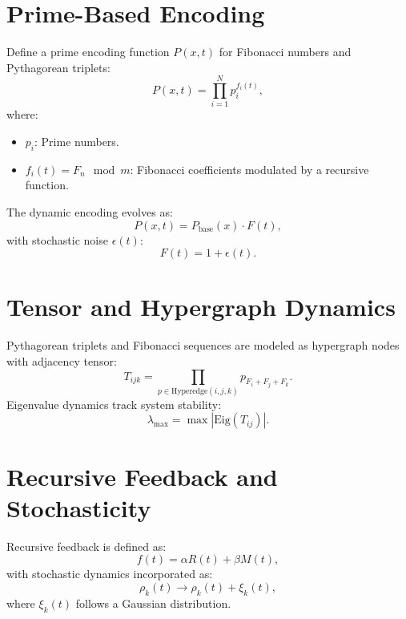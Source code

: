 \documentclass{article}
\theoremstyle{plain}
\begin{document}
\section{Prime-Based Encoding}
Define a prime encoding function $P(x, t)$ for Fibonacci numbers and Pythagorean triplets:
\begin{equation}
    P(x, t) = \prod_{i=1}^{N} p_i^{f_i(t)},
\end{equation}
where:
\begin{itemize}
    \item $p_i$: Prime numbers.
    \item $f_i(t) = F_n \mod m$: Fibonacci coefficients modulated by a recursive function.
\end{itemize}
The dynamic encoding evolves as:
\begin{equation}
    P(x, t) = P_{\text{base}}(x) \cdot F(t),
\end{equation}
with stochastic noise $\epsilon(t)$:
\begin{equation}
    F(t) = 1 + \epsilon(t).
\end{equation}

\section{Tensor and Hypergraph Dynamics}
Pythagorean triplets and Fibonacci sequences are modeled as hypergraph nodes with adjacency tensor:
\begin{equation}
    T_{ijk} = \prod_{p \in \text{Hyperedge}(i,j,k)} p_{F_i + F_j + F_k}.
\end{equation}
Eigenvalue dynamics track system stability:
\begin{equation}
    \lambda_{\text{max}} = \max |\text{Eig}(T_{ij})|.
\end{equation}

\section{Recursive Feedback and Stochasticity}
Recursive feedback is defined as:
\begin{equation}
    f(t) = \alpha R(t) + \beta M(t),
\end{equation}
with stochastic dynamics incorporated as:
\begin{equation}
    \rho_k(t) \to \rho_k(t) + \xi_k(t),
\end{equation}
where $\xi_k(t)$ follows a Gaussian distribution.
\end{document}
